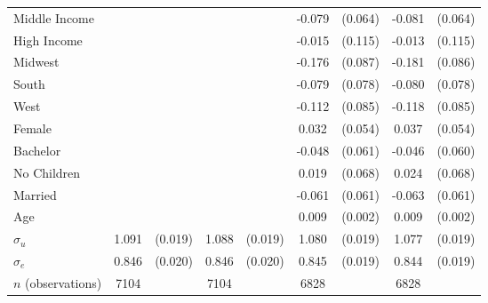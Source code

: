 \documentclass[12pt]{article}
\newcommand{\sym}[1]{\rlap{$^{#1}$}}
\begin{document}
\begin{table}[H]
{\begin{tabular}{l*{4}{cc}}
Middle Income&                     &            &                     &            &      -0.079         &     (0.064)&      -0.081         &     (0.064)\\
High Income &                     &            &                     &            &      -0.015         &     (0.115)&      -0.013         &     (0.115)\\
Midwest     &                     &            &                     &            &      -0.176\sym{**} &     (0.087)&      -0.181\sym{**} &     (0.086)\\
South       &                     &            &                     &            &      -0.079         &     (0.078)&      -0.080         &     (0.078)\\
West        &                     &            &                     &            &      -0.112         &     (0.085)&      -0.118         &     (0.085)\\
Female      &                     &            &                     &            &       0.032         &     (0.054)&       0.037         &     (0.054)\\
Bachelor    &                     &            &                     &            &      -0.048         &     (0.061)&      -0.046         &     (0.060)\\
No Children &                     &            &                     &            &       0.019         &     (0.068)&       0.024         &     (0.068)\\
Married     &                     &            &                     &            &      -0.061         &     (0.061)&      -0.063         &     (0.061)\\
Age         &                     &            &                     &            &       0.009\sym{***}&     (0.002)&       0.009\sym{***}&     (0.002)\\
$\sigma_u $    &       1.091\sym{***}&     (0.019)&       1.088\sym{***}&     (0.019)&       1.080\sym{***}&     (0.019)&       1.077\sym{***}&     (0.019)\\
$\sigma_e $     &       0.846\sym{***}&     (0.020)&       0.846\sym{***}&     (0.020)&       0.845\sym{***}&     (0.019)&       0.844\sym{***}&     (0.019)\\
\hline
\(n\) (observations)      &        7104         &            &        7104         &            &        6828         &            &        6828         &            \\


\end{tabular}}
\end{table}
\end{document}
